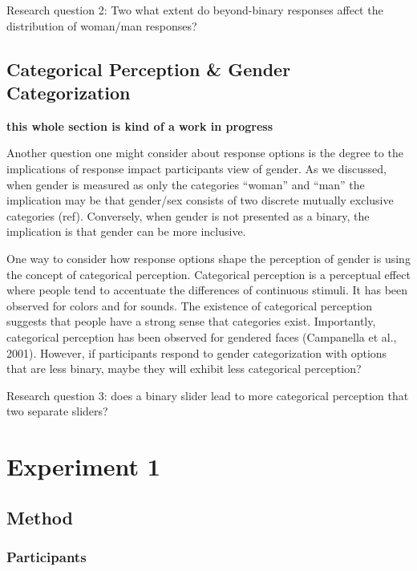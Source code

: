 \documentclass[
  man]{apa7}
\begin{document}
Research question 2: Two what extent do beyond-binary responses affect the distribution of woman/man responses?

\hypertarget{categorical-perception-gender-categorization}{%
\subsection{Categorical Perception \& Gender Categorization}\label{categorical-perception-gender-categorization}}

\textbf{this whole section is kind of a work in progress}

Another question one might consider about response options is the degree to the implications of response impact participants view of gender. As we discussed, when gender is measured as only the categories ``woman'' and ``man'' the implication may be that gender/sex consists of two discrete mutually exclusive categories (ref). Conversely, when gender is not presented as a binary, the implication is that gender can be more inclusive.

One way to consider how response options shape the perception of gender is using the concept of categorical perception. Categorical perception is a perceptual effect where people tend to accentuate the differences of continuous stimuli. It has been observed for colors and for sounds. The existence of categorical perception suggests that people have a strong sense that categories exist. Importantly, categorical perception has been observed for gendered faces (Campanella et al., 2001). However, if participants respond to gender categorization with options that are less binary, maybe they will exhibit less categorical perception?

Research question 3: does a binary slider lead to more categorical perception that two separate sliders?

\hypertarget{experiment-1}{%
\section{Experiment 1}\label{experiment-1}}

\hypertarget{method}{%
\subsection{Method}\label{method}}

\hypertarget{participants}{%
\subsubsection{Participants}\label{participants}}
\end{document}
